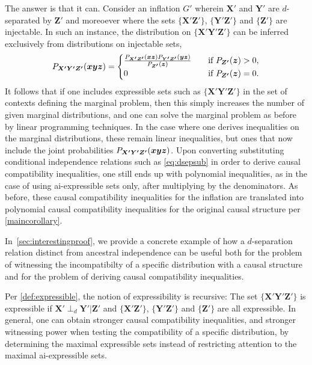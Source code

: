 \documentclass[aps,english,10pt,superscriptaddress,onecolumn,twoside,longbibliography,pra,floatfix,fleqn,nofootinbib]{revtex4-1}
\theoremstyle{definition}
\newcounter{example}[section]
\newcommand{\p}[2][]{{P_{#1}}\parenths{#2}}
\newcommand{\aindep}{\ensuremath{\perp_d}}
\DeclarePairedDelimiter{\parenths}{\lparen}{\rparen}
\begin{document}
The answer is that it can.  
Consider an inflation $G'$ wherein  $\bm{X'}$ and $\bm{Y'}$ are $d$-separated by $\bm{Z'}$ and moreoever where the sets $\{\bm{X'}\bm{Z'}\}$, $\{\bm{Y'}\bm{Z'}\}$ and $\{\bm{Z'}\}$ are injectable. In such an instance, the distribution on $\{\bm{X'}\bm{Y'}\bm{Z'}\}$ can be inferred exclusively from distributions on injectable sets,
\begin{align}\label{eq:dsepsub}
    \p[\bm{X'}\bm{Y'}\bm{Z'}]{\bm{x}\bm{y}\bm{z}}=\begin{cases}\frac{\p[\bm{X'}\bm{Z'}]{\bm{x}\bm{z}}\p[\bm{Y'}\bm{Z'}]{\bm{y}\bm{z}}}{\p[\bm{Z'}]{\bm{z}}} & \quad\text{if }\p[\bm{Z'}]{\bm{z}}>0, \\
    0 & \quad\text{if }\p[\bm{Z'}]{\bm{z}}= 0.
    \end{cases}
\end{align}
It follows that if one includes expressible sets such as $\{\bm{X'}\bm{Y'}\bm{Z'}\}$ in the set of contexts defining the marginal problem,
then this simply increases the number of given marginal distributions, and one can solve the marginal problem as before by linear programming techniques.  In the case where one derives inequalities on the marginal distributions, these remain linear inequalities, but ones that now include the joint probabilities $\p[\bm{X'}\bm{Y'}\bm{Z'}]{\bm{x}\bm{y}\bm{z}}$. Upon converting substituting conditional independence relations such as \cref{eq:dsepsub} in order to derive causal compatibility inequalities, one still ends up with polynomial inequalities, as in the case of using ai-expressible sets only, after multiplying by the denominators.
As before, these causal compatibility inequalities for the inflation are translated into polynomial causal compatibility inequalities for the original causal structure per \cref{maincorollary}.  

In~\cref{sec:interestingproof}, we provide a concrete example of how a $d$-separation relation distinct from ancestral independence can be useful both for the problem of witnessing the incompatibilty of a specific distribution with a causal structure and for the problem of deriving causal compatibility inequalities.

Per \cref{def:expressible}, the notion of expressibility is recursive: The set $\{\bm{X'}\bm{Y'}\bm{Z'}\}$ is expressible if $\bm{X'}\aindep\bm{Y'}|\bm{Z'}$ and $\{\bm{X'}\bm{Z'}\}$, $\{\bm{Y'}\bm{Z'}\}$ and  $\{\bm{Z'}\}$ are all expressible. 
In general, one can obtain stronger causal compatibility inequalities, and stronger witnessing power when testing the compatibility of a specific distribution, by determining the maximal expressible sets instead of restricting attention to the maximal ai-expressible sets. 
\end{document}
